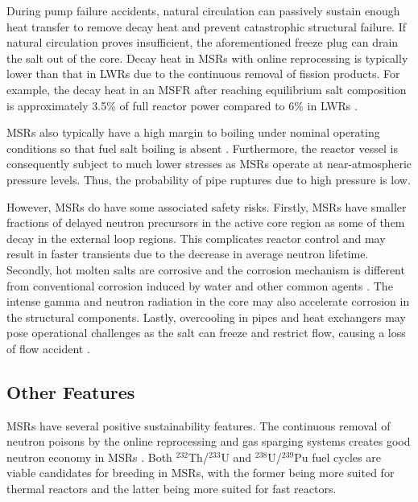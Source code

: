 During pump failure accidents, natural circulation can passively sustain
enough heat transfer to remove decay heat and prevent catastrophic structural
failure. If natural circulation proves insufficient, the aforementioned freeze
plug can drain the salt out of the core. Decay heat in \glspl{MSR} with online
reprocessing is typically lower than that in \glspl{LWR} due to the
continuous removal of fission products. For example, the decay heat in an
\gls{MSFR} after reaching equilibrium salt composition is approximately
3.5\% of full reactor power compared to 6\% in \glspl{LWR}
\cite{brovchenko_design-related_2013}.

\glspl{MSR} also typically have a high margin to boiling under nominal
operating conditions so that fuel salt boiling is absent
\cite{elsheikh_safety_2013}. Furthermore, the reactor vessel is consequently
subject to much lower stresses as \glspl{MSR} operate at near-atmospheric
pressure levels. Thus, the probability of pipe ruptures due to high pressure
is low.

However, \glspl{MSR} do have some associated safety risks.
Firstly, \glspl{MSR} have smaller fractions of delayed neutron precursors in
the active core region as some of them decay in the external loop regions.
This complicates reactor control and may result in faster transients due to
the decrease in average neutron lifetime. Secondly, hot molten salts are
corrosive and the corrosion mechanism is different from conventional
corrosion induced by water and other common agents \cite{yoshioka_7_2017}. The
intense gamma and neutron radiation in the core may also accelerate corrosion
in the structural components. Lastly, overcooling in pipes and heat exchangers
may pose operational challenges as the salt can freeze and restrict flow,
causing a loss of flow accident \cite{ho_molten_2013}.

\subsection{Other Features}

\glspl{MSR} have several positive sustainability features.
The continuous removal of neutron poisons by the online reprocessing and gas
sparging systems creates good neutron economy in \glspl{MSR}
\cite{kamei_recent_2012}. Both
$^{232}$Th/$^{233}$U and $^{238}$U/$^{239}$Pu fuel cycles are viable
candidates for breeding in \glspl{MSR}, with the former being more suited for
thermal reactors and the latter being more suited for fast reactors.

